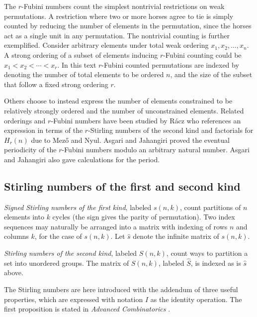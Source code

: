 \documentclass[12pt,reqno]{article}
\begin{document}
The $r$-Fubini numbers count the simplest nontrivial restrictions on weak permutations. A restriction where two  or more horses agree to tie is simply counted by reducing the number of elements in the permutation, since the horses act as a single unit in any permutation. The nontrivial counting is further exemplified. Consider arbitrary elements under total weak ordering $x_{1}, x_{2}, \ldots, x_{n}$. A strong ordering of a subset of elements inducing $r$-Fubini counting could be $x_{1} < x_{2} < \cdots < x_{r}$. In this text $r$-Fubini counted permutations are indexed by denoting the number of total elements to be ordered $n$, and the size of the subset  that follow a fixed strong ordering $r$.

Others choose to instead express the number of elements constrained to be relatively strongly ordered and the number of unconstrained elements. Related orderings and $r$-Fubini numbers have been studied by R\'acz  \cite{cc:racz} who references an expression in terms of the $r$-Stirling numbers of the second kind and factorials for $H_{r}(n)$ due to Mez\H{o} and Nyul. Asgari and Jahangiri \cite{cc:asgari} proved the eventual periodicity of the $r$-Fubini numbers modulo an arbitrary natural number. Asgari and Jahangiri also gave calculations for the period.

\subsection{Stirling numbers of the first and second kind}\label{sec:stirling}

\begin{definition}
	{\em Signed Stirling numbers of the first kind}, labeled $s(n,k)$, count partitions of $n$ elements into $k$ cycles (the sign gives the parity of permutation). Two index sequences may naturally be arranged into a matrix with indexing of rows $n$ and columns $k$, for the case of $s(n,k)$. Let $\hat{s}$ denote the infinite matrix of $s(n,k)$.
\end{definition}

\begin{definition}
	{\em Stirling numbers of the second kind}, labeled $S(n,k)$, count ways to partition a set into unordered groups. The matrix of $S(n,k)$, labeled $\hat{S}$, is indexed as is $\hat{s}$ above.
\end{definition}

The Stirling numbers are here introduced with the addendum of three useful properties, which are expressed with notation $I$ as the identity operation. The first proposition is stated in \textit{Advanced Combinatorics} \cite[Eqn.\ 6f, p.\ 144]{cc:matrix}.
\end{document}
